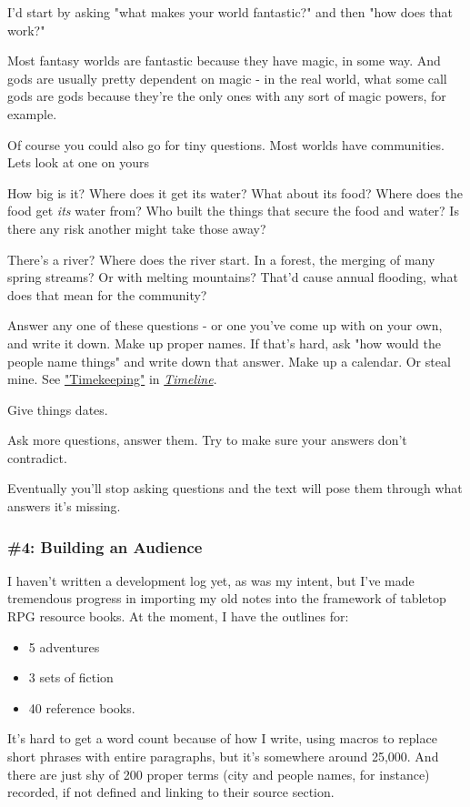 \documentclass[11pt]{article}
\begin{document}
I'd start by asking "what makes your world fantastic?" and then "how
does that work?"

Most fantasy worlds are fantastic because they have magic, in some
way. And gods are usually pretty dependent on magic - in the real
world, what some call gods are gods because they're the only ones with
any sort of magic powers, for example.

Of course you could also go for tiny questions. Most worlds have
communities. Lets look at one on yours

How big is it? Where does it get its water? What about its food? Where
does the food get \emph{its} water from? Who built the things that secure
the food and water? Is there any risk another might take those away?

There's a river? Where does the river start. In a forest, the merging
of many spring streams? Or with melting mountains? That'd cause annual
flooding, what does that mean for the community?

Answer any one of these questions - or one you've come up with on your
own, and write it down. Make up proper names. If that's hard, ask "how
would the people name things" and write down that answer. Make up a
calendar. Or steal mine. See \href{../reference-books/timeline.org}{"Timekeeping"} in \href{../reference-books/timeline.org}{\emph{Timeline}}.

Give things dates.

Ask more questions, answer them. Try to make sure your answers don't
contradict.

Eventually you'll stop asking questions and the text will pose them
through what answers it's missing.
\subsubsection*{\#4: Building an Audience}
\label{sec:orgd326819}
I haven't written a development log yet, as was my intent, but I've
made tremendous progress in importing my old notes into the framework
of tabletop RPG resource books. At the moment, I have the outlines
for:
\begin{itemize}
\item 5 adventures
\item 3 sets of fiction
\item 40 reference books.
\end{itemize}

It's hard to get a word count because of how I write, using macros to
replace short phrases with entire paragraphs, but it's somewhere
around 25,000. And there are just shy of 200 proper terms (city and
people names, for instance) recorded, if not defined and linking to
their source section.
\end{document}
